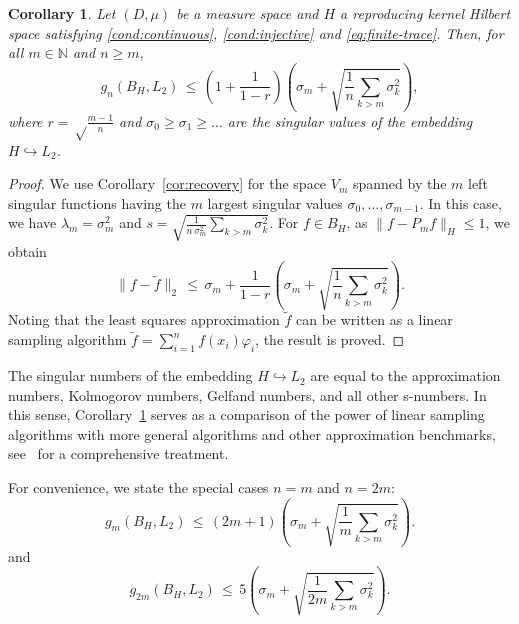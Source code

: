 \documentclass[a4paper,11pt]{article}
\renewcommand{\(}{\left (}
\renewcommand{\)}{\right )}
\newcommand{\<}{\langle}
\renewcommand{\>}{\rangle}
\renewcommand{\phi}{\varphi}
\newcommand{\N}{\mathbb{N}}
\newtheorem{coro}[theorem]{Corollary}
\theoremstyle{definition}
\begin{document}
\begin{coro}\label{cor:sampling-numbers-H}
Let $(D,\mu)$ be a measure space 
and $H$ a reproducing kernel Hilbert space 
satisfying \eqref{cond:continuous}, \eqref{cond:injective} and \eqref{eq:finite-trace}.
Then, for all $m\in \N$ and $n\geq m$,
\[
g_n(B_H,L_2) 
\,\leq\, \left(1+\frac{1}{1-r}\right)
\left(\sigma_m + \sqrt{\frac{1}{n}\sum_{k> m} \sigma_k^2} \right),
\]
where $r=\sqrt\frac{m-1}{n}$ and $\sigma_0 \geq \sigma_1 \geq \hdots$ are the singular values
of the embedding $H\hookrightarrow L_2$.
\end{coro}

\begin{proof}
  We use Corollary~\ref{cor:recovery}
  for the space $V_m$ spanned by the $m$ left singular functions having
  the $m$ largest singular values $\sigma_0,\hdots,\sigma_{m-1}$.
  In this case, 
  we have $\lambda_m=\sigma_m^2$ and $s=\sqrt{\frac1{n\,\sigma_m^2} \sum_{k> m} \sigma_k^2}$. For $f\in B_H$, as $\big\|f-P_m f\big\|_H\leq 1$, we obtain
  \[
    \big\|f- \tilde f\big\|_2 
    \,\leq\, \sigma_m+\frac{1}{1-r}\left(\sigma_m + \sqrt{\frac{1}{n}\sum_{k> m} \sigma_k^2} \right).
  \]
  Noting that the least squares approximation $\tilde f$ can be written as a linear sampling algorithm $\tilde f = \sum_{i=1}^n f(x_i) 
\phi_i$, the result is proved.
\end{proof}

The singular numbers of the embedding $H\hookrightarrow L_2$
are equal to the approximation numbers, 
Kolmogorov numbers, Gelfand numbers, and all other s-numbers.
In this sense, Corollary~\ref{cor:sampling-numbers-H} serves as a comparison 
of the power of linear sampling algorithms
with more general algorithms and other approximation benchmarks, see~\cite[Sec.\,10.1]{KU-acta} for a comprehensive treatment.

For convenience, we state the special cases $n=m$ and $n=2m$:
\begin{equation}\label{eq:n-is-m}
g_m(B_H,L_2) 
\,\leq\, (2 m+1) \left(\sigma_m + \sqrt{\frac{1}{m}\sum_{k> m}\sigma_k^2} \right).
\end{equation}
and 
\begin{equation}\label{eq:n-is-2m}
g_{2m}(B_H,L_2) 
\,\leq\, 5
\left(\sigma_m + \sqrt{\frac{1}{2m}\sum_{k> m} \sigma_k^2} \right).
\end{equation}

\smallskip
\end{document}
